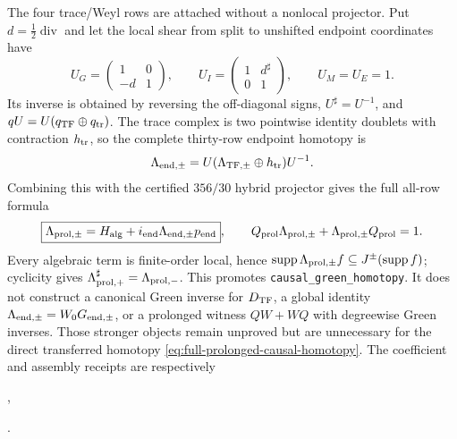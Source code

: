 \documentclass[11pt]{article}
\theoremstyle{definition}
\theoremstyle{remark}
\begin{document}
The four trace/Weyl rows are attached without a nonlocal projector.  Put
$d=\frac12\operatorname{div}$ and let the local shear from split to
unshifted endpoint coordinates have
\begin{equation}\label{eq:trace-Weyl-shear}
 U_G=\begin{pmatrix}1&0\\-d&1\end{pmatrix},
 \qquad
 U_I=\begin{pmatrix}1&d^\sharp\\0&1\end{pmatrix},
 \qquad U_M=U_E=1.
\end{equation}
Its inverse is obtained by reversing the off-diagonal signs,
$U^\sharp=U^{-1}$, and $qU=U(q_{\rm TF}\oplus q_{\rm tr})$.  The trace
complex is two pointwise identity doublets with contraction $h_{\rm tr}$,
so the complete thirty-row endpoint homotopy is
\begin{equation}\label{eq:complete-endpoint-causal-homotopy}
 \Lambda_{{\rm end},\pm}
 =U(\Lambda_{{\rm TF},\pm}\oplus h_{\rm tr})U^{-1}.
\end{equation}
Combining this with the certified $356/30$ hybrid projector gives the full
all-row formula
\begin{equation}\label{eq:full-prolonged-causal-homotopy}
 \boxed{\Lambda_{{\rm prol},\pm}
 =H_{\rm alg}+i_{\rm end}\Lambda_{{\rm end},\pm}p_{\rm end}},
 \qquad
 Q_{\rm prol}\Lambda_{{\rm prol},\pm}
 +\Lambda_{{\rm prol},\pm}Q_{\rm prol}=1.
\end{equation}
Every algebraic term is finite-order local, hence
$\operatorname{supp}\Lambda_{{\rm prol},\pm}f\subseteq
J^\pm(\operatorname{supp}f)$; cyclicity gives
$\Lambda_{{\rm prol},+}^\sharp=\Lambda_{{\rm prol},-}$.  This promotes
\texttt{causal\_green\_homotopy}.  It does not construct a canonical Green
inverse for $D_{\rm TF}$, a global identity
$\Lambda_{{\rm end},\pm}=W_0G_{{\rm end},\pm}$, or a prolonged witness
$QW+WQ$ with degreewise Green inverses.  Those stronger objects remain
unproved but are unnecessary for the direct transferred homotopy
\eqref{eq:full-prolonged-causal-homotopy}.  The coefficient and assembly
receipts are respectively
\begin{center}\footnotesize
{},\par
{}.
\end{center}
\end{document}
